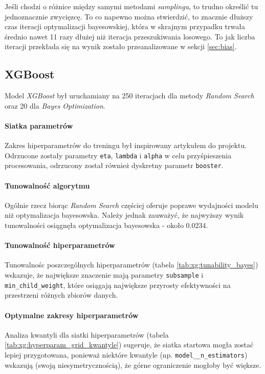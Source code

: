 \documentclass[a4paper,11pt]{article}
\begin{document}
 Jeśli chodzi o różnice między samymi metodami \textit{samplingu}, to trudno określić tu jednoznacznie zwycięzcę. To co napewno można stwierdzić, to znacznie dłuższy czas iteracji optymalizacji bayesowskiej, która w skrajnym przypadku trwała średnio nawet 11 razy dłużej niż iteracja przeszukiwania losowego. To jak liczba iteracji przekłada się na wynik zostało przeanalizowane w sekcji \ref{sec:bias}.
 
\subsection{XGBoost}
Model \textit{XGBoost} był uruchamiany na 250 iteracjach dla metody \textit{Random Search} oraz 20 dla \textit{Bayes Optimization}.

\paragraph{Siatka parametrów \vspace{2ex} \\}
Zakres hiperparametrów do treningu był inspirowany artykułem do projektu. Odrzucone zostały parametry \texttt{eta}, \texttt{lambda} i \texttt{alpha} w celu przyśpieszenia procesowania, odrzucony został również dyskretny parametr \texttt{booster}. 

\paragraph{Tunowalność algorytmu \vspace{2ex} \\}
Ogólnie rzecz biorąc \textit{Random Search} częściej oferuje poprawe wydajności modelu niż optymalizacja bayesowska. Należy jednak zauważyć, że najwyższy wynik tunowalności osiągnęła optymalizacja bayesowska - około 0.0234.

\paragraph{Tunowalność hiperparametrów \vspace{2ex} \\}
Tunowalnośc poszczególnych hiperparametrów (tabela \ref{tab:xg:tunability_bayes}) wskazuje, że największe znaczenie mają parametry \texttt{subsample} i \texttt{min\_child\_weight}, które osiągają największe przyrosty efektywności na przestrzeni różnych zbiorów danych. 

\paragraph{Optymalne zakresy hiperparametrów \vspace{2ex} \\}
Analiza kwantyli dla siatki hiperparametrów (tabela \ref{tab:xg:hyperparam_grid_kwantyle}) sugeruje, że siatka startowa mogła zostać lepiej przygotowana, ponieważ niektóre kwantyle (np. \texttt{model\_\_n\_estimators}) wskazują (swoją niesymetrycznością), że górne ograniczenie mogłoby być większe.
\end{document}
